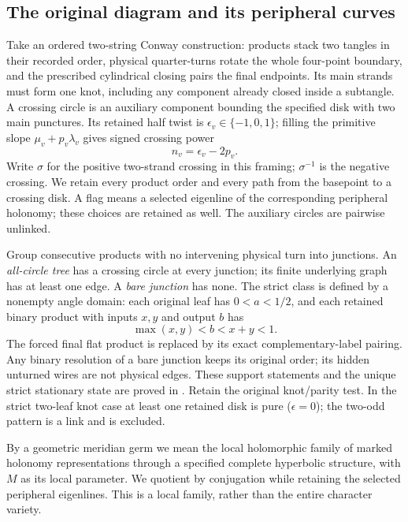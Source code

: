 \documentclass[11pt]{article}
\numberwithin{equation}{section}
\theoremstyle{definition}\newtheorem{definition}[theorem]{Definition}
\theoremstyle{remark}\newtheorem{remark}[theorem]{Remark}
\begin{document}
\subsection{The original diagram and its peripheral curves}
Take an ordered two-string Conway construction: products stack two tangles in their recorded order, physical quarter-turns rotate the whole four-point boundary, and the prescribed cylindrical closing pairs the final endpoints. Its main strands must form one knot, including any component already closed inside a subtangle. A crossing circle is an auxiliary component bounding the specified disk with two main punctures. Its retained half twist is $\epsilon_v\in\{-1,0,1\}$; filling the primitive slope $\mu_v+p_v\lambda_v$ gives signed crossing power
\begin{equation}\label{pl:power} n_v=\epsilon_v-2p_v.\end{equation}
Write $\sigma$ for the positive two-strand crossing in this framing;
$\sigma^{-1}$ is the negative crossing.
We retain every product order and every path from the basepoint to a
crossing disk. A flag means a selected eigenline of the corresponding
peripheral holonomy; these choices are retained as well. The auxiliary circles are pairwise unlinked.

Group consecutive products with no intervening physical turn into junctions. An \emph{all-circle tree} has a crossing circle at every junction; its finite underlying graph has at least one edge. A \emph{bare junction} has none. The strict class is defined by a nonempty angle domain: each original leaf has $0<a<1/2$, and each retained binary product with inputs $x,y$ and output $b$ has
\begin{equation}\label{pl:strict} \max(x,y)<b<x+y<1.\end{equation}
The forced final flat product is replaced by its exact complementary-label pairing. Any binary resolution of a bare junction keeps its original order; its hidden unturned wires are not physical edges. These support statements and the unique strict stationary state are proved in \cite[Sections 5--7]{Newton}. Retain the original knot/parity test. In the strict two-leaf knot case at least one retained disk is pure ($\epsilon=0$); the two-odd pattern is a link and is excluded.

By a geometric meridian germ we mean the local holomorphic family
of marked holonomy representations through a specified complete
hyperbolic structure, with $M$ as its local parameter. We quotient
by conjugation while retaining the selected peripheral eigenlines.
This is a local family, rather than the entire character variety.
\end{document}
